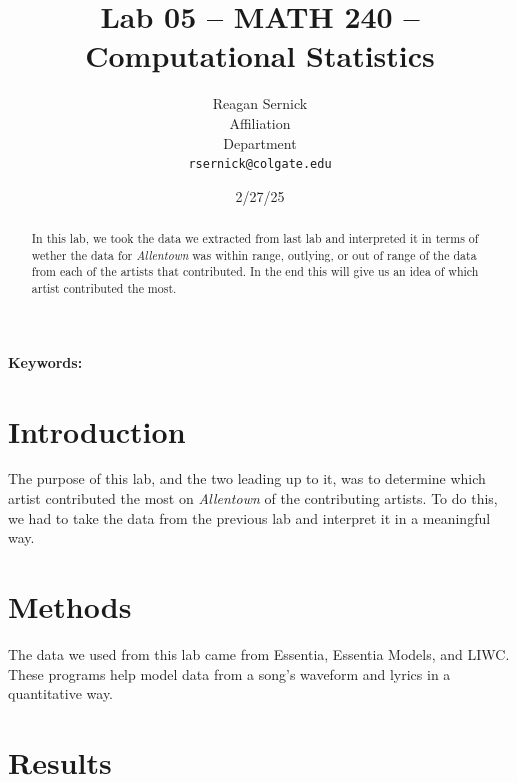 \documentclass{article}\usepackage[]{graphicx}\usepackage[]{xcolor}
\begin{document}
\vspace{-1in}
\title{Lab 05 -- MATH 240 -- Computational Statistics}

\author{
  Reagan Sernick \\
  Affiliation  \\
  Department  \\
  {\tt rsernick@colgate.edu}
}

\date{2/27/25}

\maketitle

\begin{multicols}{2}
\begin{abstract}
In this lab, we took the data we extracted from last lab and interpreted it in terms of wether the data for \emph{Allentown} was within range, outlying, or out of range of the data from each of the artists that contributed. In the end this will give us an idea of which artist contributed the most.
\end{abstract}

\noindent \textbf{Keywords:} 

\section{Introduction}

The purpose of this lab, and the two leading up to it, was to determine which artist contributed the most on \emph{Allentown} of the contributing artists. To do this, we had to take the data from the previous lab and interpret it in a meaningful way.

\section{Methods}

The data we used from this lab came from Essentia, Essentia Models, and LIWC. These programs help model data from a song's waveform and lyrics in a quantitative way.

\subsection{}



\pagebreak

\onecolumn

\section{Results}








\end{multicols}
\end{document}
